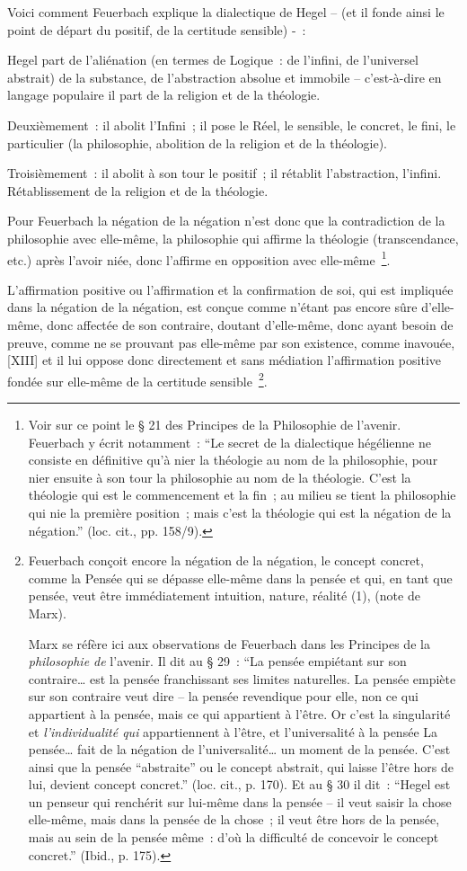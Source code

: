 \documentclass[french,twoside]{book} %
\begin{document}
Voici comment Feuerbach explique la dialectique de Hegel – (et il fonde ainsi le point de départ du positif, de la certitude sensible) - :\par
Hegel part de l’aliénation (en termes de Logique : de l’infini, de l’universel abstrait) de la substance, de l’abstraction absolue et immobile – c’est-à-dire en langage populaire il part de la religion et de la théologie.\par
Deuxièmement : il abolit l’Infini ; il pose le Réel, le sensible, le concret, le fini, le particulier (la philosophie, abolition de la religion et de la théologie).\par
Troisièmement : il abolit à son tour le positif ; il rétablit l’abstraction, l’infini. Rétablissement de la religion et de la théologie.\par
Pour Feuerbach la négation de la négation n’est donc que la contradiction de la philosophie avec elle-même, la philosophie qui affirme la théologie (transcendance, etc.) après l’avoir niée, donc l’affirme en opposition avec elle-même \footnote{Voir sur ce point le § 21 des Principes de la Philosophie de l’avenir. Feuerbach y écrit notamment : “Le secret de la dialectique hégélienne ne consiste en définitive qu’à nier la théologie au nom de la philosophie, pour nier ensuite à son tour la philosophie au nom de la théologie. C’est la théologie qui est le commencement et la fin ; au milieu se tient la philosophie qui nie la première position ; mais c’est la théologie qui est la négation de la négation.” (loc. cit., pp. 158/9).}.\par
L’affirmation positive ou l’affirmation et la confirmation de soi, qui est impliquée dans la négation de la négation, est conçue comme n’étant pas encore sûre d’elle-même, donc affectée de son contraire, doutant d’elle-même, donc ayant besoin de preuve, comme ne se prouvant pas elle-même par son existence, comme inavouée, [XIII] et il lui oppose donc directement et sans médiation l’affirmation positive fondée sur elle-même de la certitude sensible \footnote{ \noindent Feuerbach conçoit encore la négation de la négation, le concept concret, comme la Pensée qui se dépasse elle-même dans la pensée et qui, en tant que pensée, veut être immédiatement intuition, nature, réalité (1), (note de Marx).\par
 Marx se réfère ici aux observations de Feuerbach dans les Principes de la \emph{philosophie de} l’avenir. Il dit au § 29 : “La pensée empiétant sur son contraire… est la pensée franchissant ses limites naturelles. La pensée empiète sur son contraire veut dire – la pensée revendique pour elle, non ce qui appartient à la pensée, mais ce qui appartient à l’être. Or c’est la singularité et \emph{l’individualité qui} appartiennent à l’être, et l’universalité à la pensée La pensée… fait de la négation de l’universalité… un moment de la pensée. C’est ainsi que la pensée “abstraite” ou le concept abstrait, qui laisse l’être hors de lui, devient concept concret.” (loc. cit., p. 170). Et au § 30 il dit : “Hegel est un penseur qui renchérit sur lui-même dans la pensée – il veut saisir la chose elle-même, mais dans la pensée de la chose ; il veut être hors de la pensée, mais au sein de la pensée même : d’où la difficulté de concevoir le concept concret.” (Ibid., p. 175).
}.\par
\end{document}
